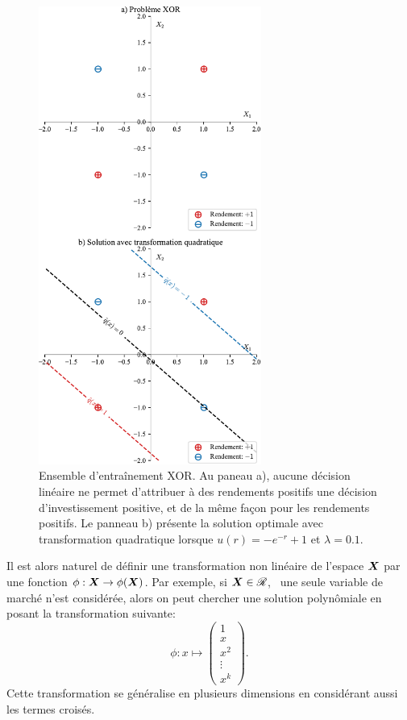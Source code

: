 \begin{figure}[p]
  \centering
  \includegraphics[width=0.65\textwidth]{../experiments/fig/pres/pres5_fr.pdf}
  \caption[Problème XOR]{Ensemble d'entraînement XOR. Au paneau a), aucune décision
    linéaire ne permet d'attribuer à des rendements positifs une décision d'investissement
    positive, et de la même façon pour les rendements positifs. Le panneau b) présente la
    solution optimale avec transformation quadratique lorsque $u(r)=-e^{-r}+1$ et
    $\lambda=0.1$.}
  \label{fig_xor}
\end{figure}


Il est alors naturel de définir une transformation non linéaire de l'espace $\bm{X}$ par une
fonction $\phi:\bm{X}\to\phi(\bm{X})$. Par exemple, si $\bm{X} \in \mathscr{R}$, \ie\ une seule variable de marché n'est
considérée, alors on peut chercher une solution polynômiale en posant la transformation
suivante:
\begin{equation}
  \phi:x \mapsto
  \begin{pmatrix}
    1 \\ x \\ x^2 \\ \vdots \\ x^k
  \end{pmatrix}.
\end{equation}
Cette transformation se généralise en plusieurs dimensions en considérant aussi les termes
croisés.

